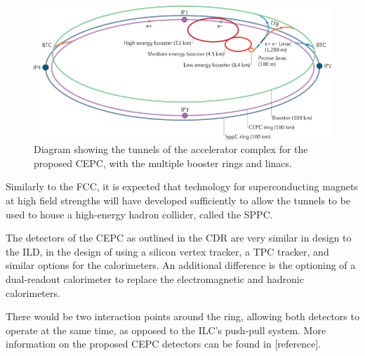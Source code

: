 \begin{figure}[h]
	\centering
	\includegraphics[width=1.0\textwidth]{../Pictures/CEPC-Scale.png}
	\caption{Diagram showing the tunnels of the accelerator complex for the proposed \acrlong{CEPC}, with the multiple booster rings and linacs.}
	\label{figure:colliders/CEPC/main}
\end{figure}

Similarly to the \acrshort{FCC}, it is expected that technology for superconducting magnets at high field strengths will have developed sufficiently to allow the tunnels to be used to house a high-energy hadron collider, called the \acrfull{SPPC}. 

The detectors of the \acrshort{CEPC} as outlined in the \acrshort{CDR} are very similar in design to the \acrshort{ILD}, in the design of using a silicon vertex tracker, a \acrshort{TPC} tracker, and similar options for the calorimeters. An additional difference is the optioning of a dual-readout calorimeter to replace the electromagnetic and hadronic calorimeters. 

There would be two interaction points around the ring, allowing both detectors to operate at the same time, as opposed to the \acrshort{ILC}'s push-pull system. More information on the proposed \acrshort{CEPC} detectors can be found in [reference].

